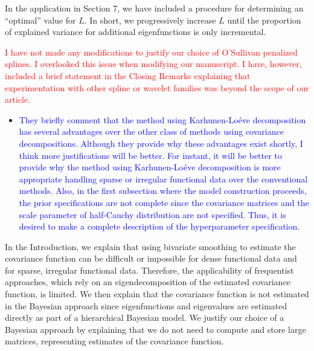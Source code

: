 \documentclass[12pt]{article}
\theoremstyle{plain}
\theoremstyle{definition}
\theoremstyle{remark}
\begin{document}
\vspace{1\baselineskip}

In the application in Section 7, we have included a procedure for determining an ``optimal'' value for $L$. In
short, we progressively increase $L$ until the proportion of explained variance for additional eigenfunctions
is only incremental.

\vspace{1\baselineskip}

\textcolor{red}{I have not made any modifications to justify our choice of O’Sullivan penalized splines. I overlooked this
issue when modifying our manuscript. I have, however, included a brief statement in the Closing Remarks explaining
that experimentation with other spline or wavelet families was beyond the scope of our article.}

\vspace{2\baselineskip}

\begin{itemize}
	\item[\textcolor{blue}{\textbullet}] \textcolor{blue}{
		They briefly comment that the method using Karhunen-Lo\'{e}ve decomposition has several advantages
		over the other class of methods using covariance decompositions. Although they provide why these advantages
		exist shortly, I think more justifications will be better. For instant, it will be better to provide why the method using
		Karhunen-Lo\'{e}ve decomposition is more appropriate handling sparse or irregular functional data over the
		conventional methods. Also, in the first subsection where the model construction proceeds, the prior specifications
		are not complete since the covariance matrices and the scale parameter of half-Cauchy distribution are not
		specified. Thus, it is desired to make a complete description of the hyperparameter specification.
	}
\end{itemize}

\vspace{1\baselineskip}

In the Introduction, we explain that using
bivariate smoothing to estimate the covariance function can be difficult or impossible
for dense functional data and for sparse, irregular functional data. Therefore, the applicability of frequentist approaches,
which rely on an eigendecomposition of the estimated covariance function, is limited. We then explain that the covariance
function is not estimated in the Bayesian approach since eigenfunctions and eigenvalues are estimated directly as part
of a hierarchical Bayesian model. We justify our choice of a Bayesian approach by explaining that we do not need
to compute and store large matrices, representing estimates of the covariance function.
\end{document}
